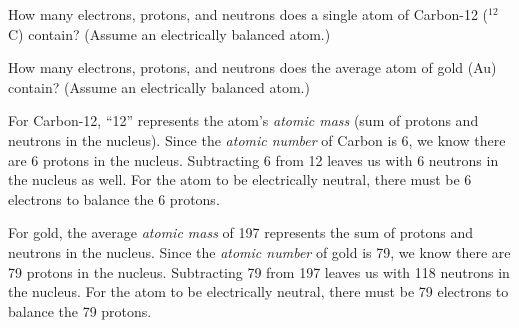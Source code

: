 

How many electrons, protons, and neutrons does a single atom of Carbon-12 ($^{12}$C) contain?  (Assume an electrically balanced atom.)

\vskip 10pt

How many electrons, protons, and neutrons does the average atom of gold (Au) contain?  (Assume an electrically balanced atom.)







For Carbon-12, ``12'' represents the atom's {\it atomic mass} (sum of protons and neutrons in the nucleus).  Since the {\it atomic number} of Carbon is 6, we know there are 6 protons in the nucleus.  Subtracting 6 from 12 leaves us with 6 neutrons in the nucleus as well.  For the atom to be electrically neutral, there must be 6 electrons to balance the 6 protons.

\vskip 10pt

For gold, the average {\it atomic mass} of 197 represents the sum of protons and neutrons in the nucleus.  Since the {\it atomic number} of gold is 79, we know there are 79 protons in the nucleus.  Subtracting 79 from 197 leaves us with 118 neutrons in the nucleus.  For the atom to be electrically neutral, there must be 79 electrons to balance the 79 protons.











